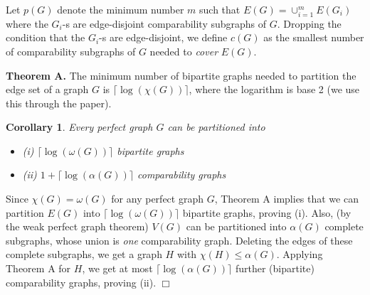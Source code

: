 \documentclass[12pt]{article}
\newtheorem{corollary}[theorem]{Corollary}
\def\qed{\ifhmode\unskip\nobreak\fi\quad\ifmmode\Box\else$\Box$\fi}
\def\qed{\hfill $\Box$}
\begin{document}
Let $p(G)$ denote the minimum number $m$ such that $E(G)=\cup_{i=1}^m E(G_i)$ where the $G_i$-s are edge-disjoint comparability subgraphs of $G$.
Dropping  the condition that the $G_i$-s are edge-disjoint, we define $c(G)$ as the smallest number of comparability subgraphs of $G$ needed to {\em cover} $E(G)$.

    {\bf Theorem A.} The minimum number of bipartite graphs needed to partition the edge set of a graph $G$ is
    $\lceil\log(\chi(G))\rceil$, where the logarithm is base 2 (we use this through the paper).

\begin{corollary}\label{genupbound}  Every perfect graph $G$ can be partitioned into
\begin{itemize}
\item (i) $\lceil\log(\omega(G))\rceil$ bipartite graphs
\item (ii) $1+\lceil\log(\alpha(G))\rceil$ comparability graphs
\end{itemize}
\end{corollary}

Since  $\chi(G)=\omega(G)$
for any perfect graph $G$, Theorem A implies that we can partition $E(G)$ into
$\lceil\log(\omega(G))\rceil$ bipartite graphs, proving (i).
Also, (by the weak perfect graph theorem) $V(G)$ can be partitioned
into $\alpha(G)$ complete subgraphs, whose union is {\em one}
comparability graph. Deleting the edges of these complete subgraphs,
we get a graph $H$ with $\chi(H)\le \alpha(G)$. Applying Theorem A
for $H$, we get at most $\lceil\log(\alpha(G))\rceil$ further
(bipartite) comparability graphs, proving (ii). \qed
\end{document}
